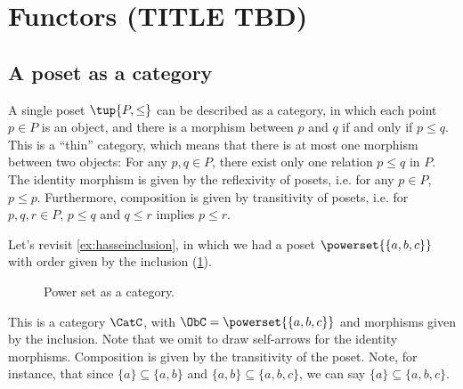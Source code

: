 \section{Functors (TITLE TBD)}


\subsection{A poset as a category}

A single poset $\tup{P, \leq}$ can be described as a category, in which
each point $p\in P$ is an object, and there is a morphism between
$p$ and $q$ if and only if $p \leq q$. This is a ``thin'' category, which means that there is at most one morphism
between two objects: For any $p,q\in P$, there exist only one relation $p\leq q$ in $P$. The identity morphism is given by the reflexivity of posets, i.e. for any $p\in P$, $p\leq p$. Furthermore, composition is given by transitivity of posets, i.e. for $p,q,r \in P$, $p\leq q$ and $q\leq r$ implies $p\leq r$.

\begin{example}
Let's revisit \cref{ex:hasseinclusion}, in which we had a poset $\powerset{\{a,b,c\}}$ with order given by the inclusion (\cref{fig:posetascat}).
\begin{figure}[h!]
\begin{center}
\end{center}
\caption{Power set as a category. \label{fig:posetascat}}
\end{figure}
This is a category $\CatC$, with $\ObC=\powerset{\{a,b,c\}}$ and morphisms given by the inclusion. Note that we omit to draw self-arrows for the identity morphisms. Composition is given by the transitivity of the poset. Note, for instance, that since $\{a\}\subseteq \{a,b\}$ and $\{a,b\} \subseteq \{a,b,c\}$, we can say $\{a\}\subseteq \{a,b,c\}$.
\end{example}


